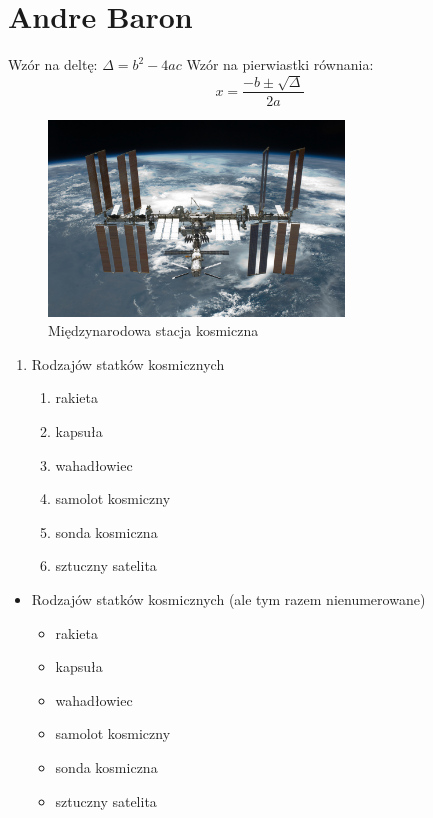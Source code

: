 \section{Andre Baron}
\label{sec: abaron}

Wzór na deltę: $ \Delta = b^2 - 4ac$
Wzór na pierwiastki równania: \[x=\frac{-b\pm\sqrt{\Delta}}{2a}\]

\begin{figure}[htbp]
    \centering
    \includegraphics[width=0.7\textwidth]{pictures/iss.jpg}
    \caption{Międzynarodowa stacja kosmiczna}
    \label{fig:iss}
\end{figure}

\begin{enumerate}
    \item Rodzajów statków kosmicznych
    \begin{enumerate}
        \item rakieta
        \item kapsuła
        \item wahadłowiec
        \item samolot kosmiczny
        \item sonda kosmiczna
        \item sztuczny satelita
    \end{enumerate}
\end{enumerate}

\begin{itemize}
    \item Rodzajów statków kosmicznych (ale tym razem nienumerowane)
    \begin{itemize}
        \item rakieta
        \item kapsuła
        \item wahadłowiec
        \item samolot kosmiczny
        \item sonda kosmiczna
        \item sztuczny satelita
    \end{itemize}
\end{itemize}

